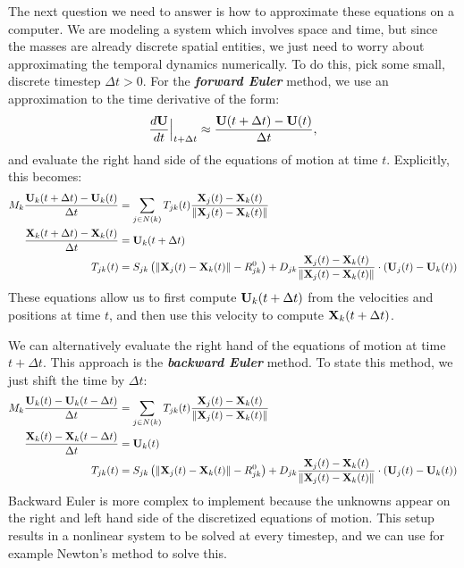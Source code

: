 \documentclass[10pt]{article}
\begin{document}
The next question we need to answer is how to approximate these equations on a computer.  We are modeling a system which involves space and time, but since the masses are already discrete spatial entities, we just need to worry about approximating the temporal dynamics numerically.  To do this, pick some small, discrete timestep $\Delta t > 0$.  For the {\bf \em forward Euler} method, we use an approximation to the time derivative of the form:
\begin{align*}
\frac{d {\bf U}}{dt}\Big|_{t + \Delta t} \approx \frac{{\bf U}(t+\Delta t ) - {\bf U}(t)}{\Delta t},
\end{align*}
and evaluate the right hand side of the equations of motion at time $t$.  Explicitly, this becomes:
\begin{align*}
M_k \frac{{\bf U}_k(t + \Delta t) - {\bf U}_k(t)}{\Delta t} &= \sum_{j \in N(k)} T_{jk}(t) \frac{{\bf X}_j(t) - {\bf X}_k(t)}{\| {\bf X}_j(t) - {\bf X}_k(t) \|} \\
\frac{{\bf X}_k(t + \Delta t) - {\bf X}_k(t)}{\Delta t} &= {\bf U}_k(t + \Delta t) \\
T_{jk}(t) &= S_{jk} \left( \|{\bf X}_j(t) - {\bf X}_k(t)\| - R^0_{jk} \right) + D_{jk} \frac{{\bf X}_j(t) - {\bf X}_k(t)}{\|{\bf X}_j(t) - {\bf X}_k(t)\|} \cdot ({\bf U}_j(t) - {\bf U}_k(t))
\end{align*}
These equations allow us to first compute ${\bf U}_k(t + \Delta t)$ from the velocities and positions at time $t$, and then use this velocity to compute ${\bf X}_k(t + \Delta t)$. 

We can alternatively evaluate the right hand of the equations of motion at time $t + \Delta t$.  This approach is the {\bf \em backward Euler} method.  To state this method, we just shift the time by $\Delta t$:
\begin{align*}
M_k \frac{{\bf U}_k(t) - {\bf U}_k(t- \Delta t)}{\Delta t} &= \sum_{j \in N(k)} T_{jk}(t) \frac{{\bf X}_j(t) - {\bf X}_k(t)}{\| {\bf X}_j(t) - {\bf X}_k(t) \|} \\
\frac{{\bf X}_k(t) - {\bf X}_k(t - \Delta t)}{\Delta t} &= {\bf U}_k(t) \\
T_{jk}(t) &= S_{jk} \left( \|{\bf X}_j(t) - {\bf X}_k(t)\| - R^0_{jk} \right) + D_{jk} \frac{{\bf X}_j(t) - {\bf X}_k(t)}{\|{\bf X}_j(t) - {\bf X}_k(t)\|} \cdot ({\bf U}_j(t) - {\bf U}_k(t))
\end{align*}
Backward Euler is more complex to implement because the unknowns appear on the right and left hand side of the discretized equations of motion.  This setup results in a nonlinear system to be solved at every timestep, and we can use for example Newton's method to solve this.
\end{document}
